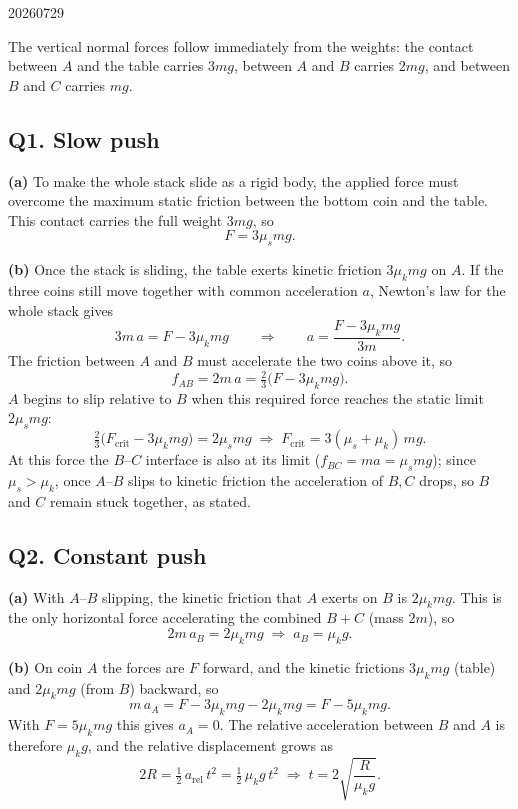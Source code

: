 \begin{solution}{20260729}

The vertical normal forces follow immediately from the weights: the contact between $A$ and the table carries $3mg$, between $A$ and $B$ carries $2mg$, and between $B$ and $C$ carries $mg$.

\subsection*{Q1. Slow push}

\textbf{(a)}  To make the whole stack slide as a rigid body, the applied force must overcome the maximum static friction between the bottom coin and the table.  This contact carries the full weight $3mg$, so
\[
  \boxed{F = 3\mu_s m g}.
\]

\textbf{(b)}  Once the stack is sliding, the table exerts kinetic friction $3\mu_k mg$ on $A$.  If the three coins still move together with common acceleration $a$, Newton's law for the whole stack gives
\[
  3m\,a = F - 3\mu_k m g
  \qquad\Longrightarrow\qquad
  a = \frac{F - 3\mu_k m g}{3m}.
\]
The friction between $A$ and $B$ must accelerate the two coins above it, so
\[
  f_{AB} = 2m\,a = \tfrac{2}{3}\bigl(F - 3\mu_k m g\bigr).
\]
$A$ begins to slip relative to $B$ when this required force reaches the static limit $2\mu_s mg$:
\[
  \tfrac{2}{3}\bigl(F_{\text{crit}} - 3\mu_k m g\bigr) = 2\mu_s m g
  \;\Longrightarrow\;
  \boxed{F_{\text{crit}} = 3(\mu_s + \mu_k)\,m g}.
\]
At this force the $B$--$C$ interface is also at its limit ($f_{BC} = m a = \mu_s mg$); since $\mu_s > \mu_k$, once $A$--$B$ slips to kinetic friction the acceleration of $B,C$ drops, so $B$ and $C$ remain stuck together, as stated.

\subsection*{Q2. Constant push}

\textbf{(a)}  With $A$--$B$ slipping, the kinetic friction that $A$ exerts on $B$ is $2\mu_k m g$.  This is the only horizontal force accelerating the combined $B+C$ (mass $2m$), so
\[
  2m\,a_B = 2\mu_k m g
  \;\Longrightarrow\;
  \boxed{a_B = \mu_k g}.
\]

\textbf{(b)}  On coin $A$ the forces are $F$ forward, and the kinetic frictions $3\mu_k mg$ (table) and $2\mu_k mg$ (from $B$) backward, so
\[
  m\,a_A = F - 3\mu_k m g - 2\mu_k m g = F - 5\mu_k m g.
\]
With $F = 5\mu_k m g$ this gives $a_A = 0$.  The relative acceleration between $B$ and $A$ is therefore $\mu_k g$, and the relative displacement grows as
\[
  2R = \tfrac12\,a_{\text{rel}}\,t^{2} = \tfrac12\,\mu_k g\,t^{2}
  \;\Longrightarrow\;
  \boxed{t = 2\sqrt{\frac{R}{\mu_k g}}}.
\]


\end{solution}
